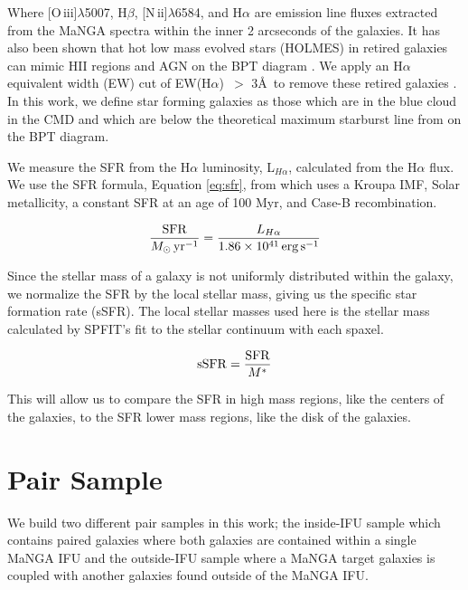 \documentclass[iop,revtex4,twocolumn,apj,numberedappendix,appendixfloats]{emulateapj}
\newcommand{\OIII}{[O\,{\sc iii}]}
\newcommand{\NII}{[N\,{\sc ii}]}
\newcommand{\ewha}{EW(H$\alpha$)}
\begin{document}
Where \OIII$\lambda$5007, H$\beta$, \NII$\lambda$6584, and H$\alpha$ are emission line fluxes extracted from the MaNGA spectra within the inner 2 arcseconds of the galaxies. It has also been shown that hot low mass evolved stars (HOLMES) in retired galaxies can mimic HII regions and AGN on the BPT diagram \citep{Stasinska:2008}. We apply an H$\alpha$ equivalent width (EW) cut of \ewha\ $>$ 3\AA\ to remove these retired galaxies \citet{Cid-Fernandes:2011}. In this work, we define star forming galaxies as those which are in the blue cloud in the CMD and which are below the theoretical maximum starburst line from \citet{Kewley:2001} on the BPT diagram.

We measure the SFR from the H$\alpha$ luminosity, L$_{H\alpha}$, calculated from the H$\alpha$ flux.  We use the SFR formula, Equation \ref{eq:sfr}, from \citet{Murphy:2011} which uses a Kroupa IMF, Solar metallicity, a constant SFR at an age of 100 Myr, and Case-B recombination. 

\begin{equation}\label{eq:sfr}
\frac{\rm{SFR}}{M_{\odot} \, \rm{yr^{-1}}} = \frac{L_{H\alpha}}{1.86 \times 10^{41}\, \rm{erg\,s}^{-1}}
\end{equation}

Since the stellar mass of a galaxy is not uniformly distributed within the galaxy, we normalize the SFR by the local stellar mass, giving us the specific star formation rate (sSFR). The local stellar masses used here is the stellar mass calculated by {\sc SPFIT}'s fit to the stellar continuum with each spaxel.

\begin{equation}
{\rm sSFR} = \frac{\rm SFR}{M^*}
\end{equation}

This will allow us to compare the SFR in high mass regions, like the centers of the galaxies, to the SFR lower mass regions, like the disk of the galaxies.

\section{Pair Sample}\label{sec:pair}
We build two different pair samples in this work; the inside-IFU sample which contains paired galaxies where both galaxies are contained within a single MaNGA IFU and the outside-IFU sample where a MaNGA target galaxies is coupled with another galaxies found outside of the MaNGA IFU. 
\end{document}

